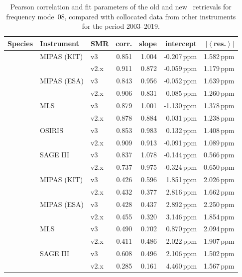 \begin{table}[tbhp]
\centering
\caption{Pearson correlation and fit parameters of the old and new \smr\
retrievals for frequency mode~08, compared with collocated data from other
instruments for the period 2003--2019.}
\label{tab:fm08:stats}
\begin{tabular}{lllrrrr}
    \toprule
    \textbf{Species} & \textbf{Instrument} & \textbf{SMR} & \textbf{corr.} & \textbf{slope} & \textbf{intercept} & \textbf{$\left|\left<\right.\right.$res.$\left.\left.\right>\right|$} \\
    \midrule
    \chem{O3}   & MIPAS (KIT)   & v3    & 0.851 & 1.004 & -0.207\,ppm   & 1.582\,ppm \\
                &               & v2.x  & 0.911 & 0.872 & -0.059\,ppm   & 1.179\,ppm \\
    \cline{2-7}
                & MIPAS (ESA)   & v3    & 0.843 & 0.956 & -0.052\,ppm   & 1.639\,ppm \\
                &               & v2.x  & 0.906 & 0.831 &  0.085\,ppm   & 1.260\,ppm \\
    \cline{2-7}
                & MLS           & v3    & 0.879 & 1.001 & -1.130\,ppm   & 1.378\,ppm \\
                &               & v2.x  & 0.878 & 0.884 &  0.031\,ppm   & 1.238\,ppm \\
    \cline{2-7}
                & OSIRIS        & v3    & 0.853 & 0.983 &  0.132\,ppm   & 1.408\,ppm \\
                &               & v2.x  & 0.909 & 0.913 & -0.091\,ppm   & 1.089\,ppm \\
    \cline{2-7}
                & SAGE III      & v3    & 0.837 & 1.078 & -0.144\,ppm   & 0.566\,ppm \\
                &               & v2.x  & 0.737 & 0.975 & -0.324\,ppm   & 0.650\,ppm \\
    \midrule
    \chem{H_2O} & MIPAS (KIT)   & v3    & 0.426 & 0.596 & 1.851\,ppm    & 2.026\,ppm \\
                &               & v2.x  & 0.432 & 0.377 & 2.816\,ppm    & 1.662\,ppm \\
    \cline{2-7}
                & MIPAS (ESA)   & v3    & 0.428 & 0.437 & 2.892\,ppm    & 2.250\,ppm \\
                &               & v2.x  & 0.455 & 0.320 & 3.146\,ppm    & 1.854\,ppm \\
    \cline{2-7}
                & MLS           & v3    & 0.490 & 0.702 & 0.870\,ppm    & 2.094\,ppm \\
                &               & v2.x  & 0.411 & 0.486 & 2.022\,ppm    & 1.907\,ppm \\
    \cline{2-7}
                & SAGE III      & v3    & 0.608 & 0.496 & 2.106\,ppm    & 1.502\,ppm \\
                &               & v2.x  & 0.285 & 0.161 & 4.460\,ppm    & 1.567\,ppm \\
    \bottomrule
\end{tabular}
\end{table}

